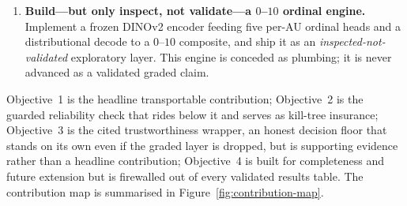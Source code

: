 \begin{enumerate}
    operating point (pain-recall $\geq 0.90$, anchored to
    \textcite{evangelista2019}; never a symmetric Youden-$J$/$F_1$ knee), made
    visible through a welfare-asymmetric decision curve, with a defer-to-vet
    abstention boundary reported as a one-sided $95\%$ negative-predictive-value
    lower bound.
  \item \textbf{Build---but only inspect, not validate---a $0$--$10$ ordinal
    engine.} Implement a frozen DINOv2 encoder feeding five per-AU ordinal heads
    and a distributional decode to a $0$--$10$ composite, and ship it as an
    \emph{inspected-not-validated} exploratory layer. This engine is conceded as
    plumbing; it is never advanced as a validated graded claim.
\end{enumerate}

Objective~1 is the headline transportable contribution; Objective~2 is the
guarded reliability check that rides below it and serves as kill-tree insurance;
Objective~3 is the cited trustworthiness wrapper, an honest decision floor that
stands on its own even if the graded layer is dropped, but is supporting
evidence rather than a headline contribution; Objective~4 is built for
completeness and future extension but is firewalled out of every validated
results table. The contribution map is summarised in
Figure~\ref{fig:contribution-map}.

